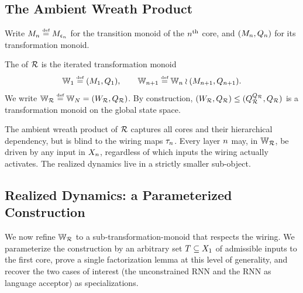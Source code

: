 \documentclass{article}
\begin{document}
\subsection{The Ambient Wreath Product}\label{sec:ambient}

Write $M_n \mathrel{\stackrel{\textnormal{\tiny def}}{=}} M_{\mathfrak{c}_n}$ for the transition monoid of the $n^{\text{th}}$ core, and $(M_n, Q_n)$ for its transformation monoid.

\begin{definition}\label{def:ambient-wreath}
The  of $\mathcal{R}$ is the iterated transformation monoid
$$
\mathbb{W}_1 \mathrel{\stackrel{\textnormal{\tiny def}}{=}} (M_1, Q_1), \qquad \mathbb{W}_{n+1} \mathrel{\stackrel{\textnormal{\tiny def}}{=}} \mathbb{W}_n \wr (M_{n+1}, Q_{n+1}).
$$
We write $\mathbb{W}_{\mathcal{R}} \mathrel{\stackrel{\textnormal{\tiny def}}{=}} \mathbb{W}_N = (W_{\mathcal{R}}, Q_{\mathcal{R}})$.
By construction, $(W_{\mathcal{R}}, Q_{\mathcal{R}}) \leq (Q_{\mathcal{R}}^{Q_{\mathcal{R}}}, Q_{\mathcal{R}})$ is a transformation monoid on the global state space.
\end{definition}

The ambient wreath product of $\mathcal{R}$ captures all cores and their hierarchical dependency, but is blind to the wiring maps $\tau_n$. 
Every layer $n$ may, in $\mathbb{W}_{\mathcal{R}}$, be driven by any input in $X_n$, regardless of which inputs the wiring actually activates. 
The realized dynamics live in a strictly smaller sub-object.

\subsection{Realized Dynamics: a Parameterized Construction}\label{sec:realized}

We now refine $\mathbb{W}_{\mathcal{R}}$ to a sub-transformation-monoid that respects the wiring. 
We parameterize the construction by an arbitrary set $T \subseteq X_1$ of admissible inputs to the first core, prove a single factorization lemma at this level of generality, and recover the two cases of interest (the unconstrained RNN and the RNN as language acceptor) as specializations.
\end{document}
